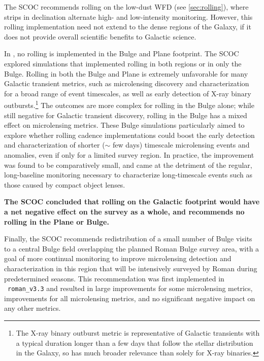 The SCOC recommends rolling on the low-dust WFD (see \autoref{sec:rolling}), where strips in declination alternate high- and low-intensity monitoring. %
However, this rolling implementation need not extend to the dense regions of the Galaxy, if it does not provide overall scientific benefits to Galactic science.

In , no rolling is implemented in the Bulge and Plane footprint. The SCOC explored simulations that implemented rolling in both regions or in only the Bulge.
Rolling in both the Bulge and Plane is extremely unfavorable for many Galactic transient metrics, such as microlensing discovery and characterization for a broad range of event timescales, as well as early detection of X-ray binary outbursts.\footnote{The X-ray binary outburst metric is representative of Galactic transients with a typical duration longer than a few days that follow the stellar distribution in the Galaxy, so has much broader relevance than solely for X-ray binaries.} The outcomes are more complex for rolling in the Bulge alone; while still negative for Galactic transient discovery, rolling in the Bulge has a mixed effect on microlensing metrics. These Bulge simulations particularly aimed to explore whether rolling cadence implementations could boost the early detection and characterization of shorter ($\sim$ few days) timescale microlensing events and anomalies, even if only for a limited survey region. In practice, the improvement was found to be comparatively small, and came at the detriment of the regular, long-baseline monitoring necessary to characterize long-timescale events such as those caused by compact object lenses.   


{\bf The SCOC concluded that rolling on the Galactic footprint would have a net negative effect on the survey as a whole, and recommends no rolling in the Plane or Bulge.}

Finally, the SCOC recommends redistribution of a small number of Bulge visits to 
a central Bulge field overlapping the planned Roman Bulge survey area, with a goal of more continual monitoring to improve microlensing detection and characterization in this region that will be intensively surveyed by Roman during predetermined seasons.
This recommendation was first implemented in \opsim\ \texttt{roman\_v3.3} and resulted in large improvements for some microlensing metrics, improvements for all microlensing metrics, and no significant negative impact on any other metrics. 

